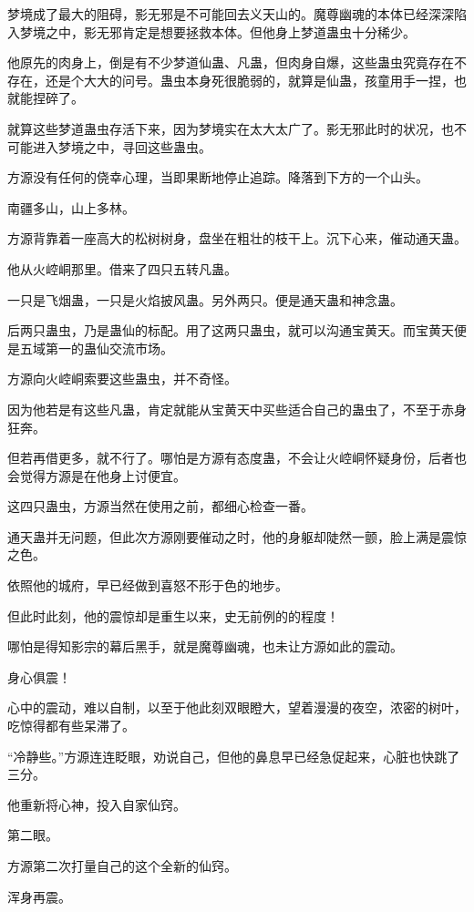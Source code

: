 \begin{this_body}
梦境成了最大的阻碍，影无邪是不可能回去义天山的。魔尊幽魂的本体已经深深陷入梦境之中，影无邪肯定是想要拯救本体。但他身上梦道蛊虫十分稀少。

他原先的肉身上，倒是有不少梦道仙蛊、凡蛊，但肉身自爆，这些蛊虫究竟存在不存在，还是个大大的问号。蛊虫本身死很脆弱的，就算是仙蛊，孩童用手一捏，也就能捏碎了。

就算这些梦道蛊虫存活下来，因为梦境实在太大太广了。影无邪此时的状况，也不可能进入梦境之中，寻回这些蛊虫。

方源没有任何的侥幸心理，当即果断地停止追踪。降落到下方的一个山头。

南疆多山，山上多林。

方源背靠着一座高大的松树树身，盘坐在粗壮的枝干上。沉下心来，催动通天蛊。

他从火崆峒那里。借来了四只五转凡蛊。

一只是飞烟蛊，一只是火焰披风蛊。另外两只。便是通天蛊和神念蛊。

后两只蛊虫，乃是蛊仙的标配。用了这两只蛊虫，就可以沟通宝黄天。而宝黄天便是五域第一的蛊仙交流市场。

方源向火崆峒索要这些蛊虫，并不奇怪。

因为他若是有这些凡蛊，肯定就能从宝黄天中买些适合自己的蛊虫了，不至于赤身狂奔。

但若再借更多，就不行了。哪怕是方源有态度蛊，不会让火崆峒怀疑身份，后者也会觉得方源是在他身上讨便宜。

这四只蛊虫，方源当然在使用之前，都细心检查一番。

通天蛊并无问题，但此次方源刚要催动之时，他的身躯却陡然一颤，脸上满是震惊之色。

依照他的城府，早已经做到喜怒不形于色的地步。

但此时此刻，他的震惊却是重生以来，史无前例的的程度！

哪怕是得知影宗的幕后黑手，就是魔尊幽魂，也未让方源如此的震动。

身心俱震！

心中的震动，难以自制，以至于他此刻双眼瞪大，望着漫漫的夜空，浓密的树叶，吃惊得都有些呆滞了。

“冷静些。”方源连连眨眼，劝说自己，但他的鼻息早已经急促起来，心脏也快跳了三分。

他重新将心神，投入自家仙窍。

第二眼。

方源第二次打量自己的这个全新的仙窍。

浑身再震。


\end{this_body}
